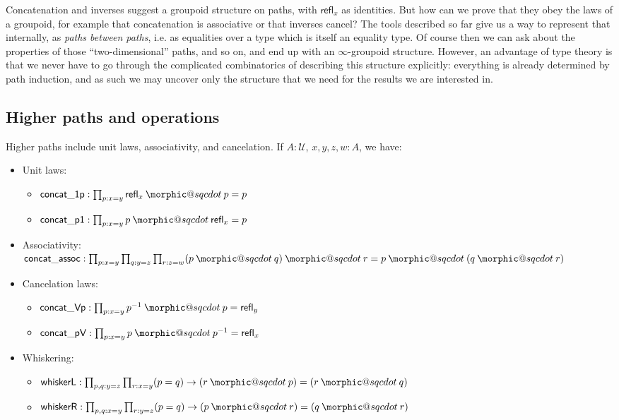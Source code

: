 \documentclass[12 pt]{amsart}
\makeatletter
\theoremstyle{definition}
\theoremstyle{remark}
\newcommand{\Type}{\mathcal{U}}
\newcommand{\refl}{\mathsf{refl}}
\newcommand{\concatonep}{\mathsf{concat\_1p}}
\newcommand{\concatpone}{\mathsf{concat\_p1}}
\newcommand{\concatassoc}{\mathsf{concat\_assoc}}
\newcommand{\concatpV}{\mathsf{concat\_pV}}
\newcommand{\concatVp}{\mathsf{concat\_Vp}}
\newcommand{\whiskerR}{\mathsf{whiskerR}}
\newcommand{\whiskerL}{\mathsf{whiskerL}}
\DeclareRobustCommand{\conc}{\mathbin{\mathpalette\morphic@sqcdot\relax}}
\newcommand{\morphic@sqcdot}[2]{%
    \sbox\z@{$\m@th#1\centerdot$}%
    \ht\z@=.33333\ht\z@
    \vcenter{\box\z@}%
    }
\makeatother
\begin{document}
Concatenation and inverses suggest a groupoid structure on paths, with $\refl_x$ as identities. But how can we prove that they obey the laws of a groupoid, for example that concatenation is associative or that inverses cancel? The tools described so far give us a way to represent that internally, as \textit{paths between paths}, i.e. as equalities over a type which is itself an equality type. Of course then we can ask about the properties of those ``two-dimensional'' paths, and so on, and end up with an $\infty$-groupoid structure. However, an advantage of type theory is that we never have to go through the complicated combinatorics of describing this structure explicitly: everything is already determined by path induction, and as such we may uncover only the structure that we need for the results we are interested in.


\subsection{Higher paths and operations}

Higher paths include unit laws, associativity, and cancelation. If $A : \Type$, $x, y, z, w : A$, we have:

\begin{itemize}
\item Unit laws: 
\begin{itemize}
\item $\concatonep : \prod_{p : x = y} \refl_x \conc p  = p$
\item $\concatpone : \prod_{p : x = y}  p \conc \refl_x = p$
\end{itemize}
\item Associativity: $\concatassoc : \prod_{p : x = y} \prod_{q : y = z} \prod_{r : z = w} (p \conc q) \conc r = p \conc (q \conc r)$
\item Cancelation laws: 
\begin{itemize}
\item $\concatVp : \prod_{p : x = y} p^{-1} \conc p = \refl_y$
\item $\concatpV : \prod_{p : x = y} p \conc p^{-1} = \refl_x$
\end{itemize}
\item Whiskering: 
\begin{itemize}
\item $\whiskerL : \prod_{p, q : y = z}\prod_{r : x = y} (p = q) \to (r \conc p) = (r \conc q)$
\item $\whiskerR :  \prod_{p, q : x = y}\prod_{r : y = z} (p = q) \to (p \conc r) = (q \conc r)$
\end{itemize}
\end{itemize}
\end{document}
